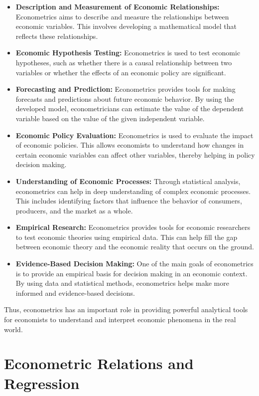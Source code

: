 \documentclass[
]{book}
\providecommand{\tightlist}{%
  \setlength{\itemsep}{0pt}\setlength{\parskip}{0pt}}
\begin{document}
\begin{itemize}
\tightlist
\item
  \textbf{Description and Measurement of Economic Relationships:} Econometrics aims to describe and measure the relationships between economic variables. This involves developing a mathematical model that reflects these relationships.
\item
  \textbf{Economic Hypothesis Testing:} Econometrics is used to test economic hypotheses, such as whether there is a causal relationship between two variables or whether the effects of an economic policy are significant.
\item
  \textbf{Forecasting and Prediction:} Econometrics provides tools for making forecasts and predictions about future economic behavior. By using the developed model, econometricians can estimate the value of the dependent variable based on the value of the given independent variable.
\item
  \textbf{Economic Policy Evaluation:} Econometrics is used to evaluate the impact of economic policies. This allows economists to understand how changes in certain economic variables can affect other variables, thereby helping in policy decision making.
\item
  \textbf{Understanding of Economic Processes:} Through statistical analysis, econometrics can help in deep understanding of complex economic processes. This includes identifying factors that influence the behavior of consumers, producers, and the market as a whole.
\item
  \textbf{Empirical Research:} Econometrics provides tools for economic researchers to test economic theories using empirical data. This can help fill the gap between economic theory and the economic reality that occurs on the ground.
\item
  \textbf{Evidence-Based Decision Making:} One of the main goals of econometrics is to provide an empirical basis for decision making in an economic context. By using data and statistical methods, econometrics helps make more informed and evidence-based decisions.
\end{itemize}

Thus, econometrics has an important role in providing powerful analytical tools for economists to understand and interpret economic phenomena in the real world.

\hypertarget{econometric-relations-and-regression}{%
\section{Econometric Relations and Regression}\label{econometric-relations-and-regression}}
\end{document}
